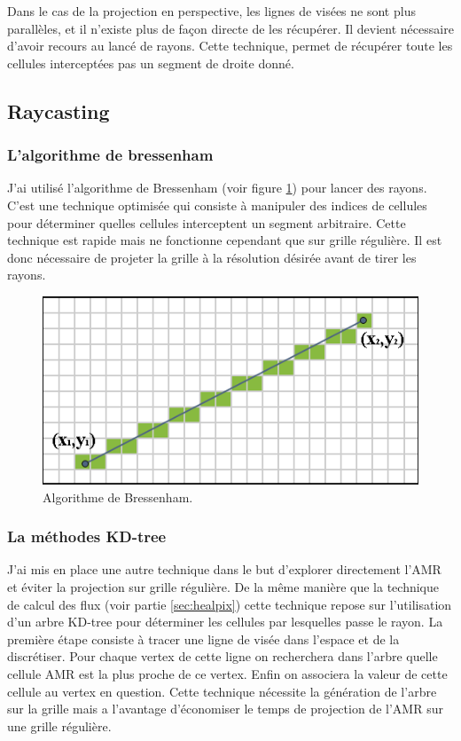 Dans le cas de la projection en perspective, les lignes de visées ne sont plus parallèles, et il n'existe plus de façon directe de les récupérer.
Il devient nécessaire d'avoir recours au lancé de rayons.
Cette technique, permet de récupérer toute les cellules interceptées pas un segment de droite donné.

\subsection{Raycasting}
\subsubsection{L'algorithme de bressenham}
J'ai utilisé l'algorithme de Bressenham (voir figure \ref{fig:bressenham}) pour lancer des rayons.
C'est une technique optimisée qui consiste à manipuler des indices de cellules pour déterminer quelles cellules interceptent un segment arbitraire.
Cette technique est rapide mais ne fonctionne cependant que sur grille régulière.
Il est donc nécessaire de projeter la grille à la résolution désirée avant de tirer les rayons.

\begin{figure}
        \includegraphics[width=.95\linewidth]{img/04/Bresenham_line.png} 
        \caption[Algorithme de Bressenham]{Algorithme de Bressenham.}
 		\label{fig:bressenham}
\end{figure}

\subsubsection{La méthodes KD-tree}

J'ai mis en place une autre technique dans le but d'explorer directement l'\ac{AMR} et éviter la projection sur grille régulière.
De la même manière que la technique de calcul des flux (voir partie \ref{sec:healpix}) cette technique repose sur l'utilisation d'un arbre KD-tree pour déterminer les cellules par lesquelles passe le rayon.
La première étape consiste à tracer une ligne de visée dans l'espace et de la discrétiser.
Pour chaque vertex de cette ligne on recherchera dans l'arbre quelle cellule \ac{AMR} est la plus proche de ce vertex.
Enfin on associera la valeur de cette cellule au vertex en question.
Cette technique nécessite la génération de l'arbre sur la grille mais a l'avantage d'économiser le temps de projection de l'\ac{AMR} sur une grille régulière.

